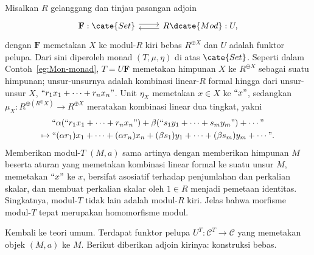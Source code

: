 \begin{example}\label{eg:Mod-monad}
	Misalkan $R$ gelanggang dan tinjau pasangan adjoin
	\[\begin{tikzcd}
		\mathbf{F}: \cate{Set} \arrow[r, shift left] & R\dcate{Mod}: U, \arrow[l, shift left]
	\end{tikzcd}\]
	dengan $\mathbf{F}$ memetakan $X$ ke modul-$R$ kiri bebas
	$R^{\oplus X}$ dan $U$ adalah funktor pelupa. Dari sini diperoleh monad
	$(T,\mu,\eta)$ di atas $\cate{Set}$. Seperti dalam
	Contoh~\ref{eg:Mon-monad}, $T=U\mathbf{F}$ memetakan himpunan $X$ ke
	$R^{\oplus X}$ sebagai suatu himpunan; unsur-unsurnya adalah kombinasi
	linear-$R$ formal hingga dari unsur-unsur $X$,
	$\text{\textquotedblleft} r_1x_1+\cdots+r_nx_n
	\text{\textquotedblright}$. Unit $\eta_X$ memetakan $x\in X$ ke
	$\text{\textquotedblleft}x\text{\textquotedblright}$, sedangkan
	$\mu_X:R^{\oplus(R^{\oplus}X)}\to R^{\oplus X}$ meratakan kombinasi linear
	dua tingkat, yakni
	\begin{multline*}
		\text{\textquotedblleft} \alpha (\text{\textquotedblleft} r_1 x_1 + \cdots + r_n x_n \text{\textquotedblright}) + \beta (\text{\textquotedblleft} s_1 y_1 + \cdots + s_m y_m \text{\textquotedblright}) + \cdots \text{\textquotedblright} \\
		\mapsto \text{\textquotedblleft} (\alpha r_1) x_1 + \cdots + (\alpha r_n) x_n + (\beta s_1) y_1 + \cdots + (\beta s_m) y_m + \cdots \text{\textquotedblright} .
	\end{multline*}
	Memberikan modul-$T$ $(M,a)$ sama artinya dengan memberikan himpunan $M$
	beserta aturan yang memetakan kombinasi linear formal ke suatu unsur $M$,
	memetakan $\text{\textquotedblleft}x\text{\textquotedblright}$ ke $x$,
	bersifat asosiatif terhadap penjumlahan dan perkalian skalar, dan membuat
	perkalian skalar oleh $1\in R$ menjadi pemetaan identitas. Singkatnya,
	modul-$T$ tidak lain adalah modul-$R$ kiri. Jelas bahwa morfisme modul-$T$
	tepat merupakan homomorfisme modul.
\end{example}

Kembali ke teori umum. Terdapat funktor pelupa
$U^T:\mathcal{C}^T\to\mathcal{C}$ yang memetakan objek $(M,a)$ ke $M$.
Berikut diberikan adjoin kirinya: konstruksi bebas.

